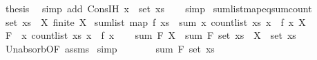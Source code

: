 \begin{isabellebody}
\ {\isacharquery}{\kern0pt}thesis\ \isamarkupfalse%
\ {\isacharparenleft}{\kern0pt}simp\ add{\isacharcolon}{\kern0pt}\ Cons{\isachardot}{\kern0pt}IH\ {\isacartoucheopen}x\ {\isasymnotin}\ set\ xs{\isacartoucheclose}{\isacharparenright}{\kern0pt}\isanewline
\ \ \isamarkupfalse%
\isanewline
{}\isamarkupfalse%
\ simp%
\endisatagproof
{\isafoldproof}%
%
\isadelimproof
\isanewline
%
\endisadelimproof
\isanewline
{}\isamarkupfalse%
\ sum{\isacharunderscore}{\kern0pt}list{\isacharunderscore}{\kern0pt}map{\isacharunderscore}{\kern0pt}eq{\isacharunderscore}{\kern0pt}sum{\isacharunderscore}{\kern0pt}count{}{\isacharcolon}{\kern0pt}\isanewline
{}\ {\isachardoublequoteopen}set\ xs\ {\isasymsubseteq}\ X{\isachardoublequoteclose}\ {\isachardoublequoteopen}finite\ X{\isachardoublequoteclose}\isanewline
{}\ {\isachardoublequoteopen}sum{\isacharunderscore}{\kern0pt}list\ {\isacharparenleft}{\kern0pt}map\ f\ xs{\isacharparenright}{\kern0pt}\ {\isacharequal}{\kern0pt}\ sum\ {\isacharparenleft}{\kern0pt}{\isasymlambda}x{\isachardot}{\kern0pt}\ count{\isacharunderscore}{\kern0pt}list\ xs\ x\ {\isacharasterisk}{\kern0pt}\ f\ x{\isacharparenright}{\kern0pt}\ X{\isachardoublequoteclose}\isanewline
%
\isadelimproof
%
\endisadelimproof
%
\isatagproof
{}\isamarkupfalse%
{\isacharminus}{\kern0pt}\isanewline
\ \ \isamarkupfalse%
\ {\isacharquery}{\kern0pt}F\ {\isacharequal}{\kern0pt}\ {\isachardoublequoteopen}{\isasymlambda}x{\isachardot}{\kern0pt}\ count{\isacharunderscore}{\kern0pt}list\ xs\ x\ {\isacharasterisk}{\kern0pt}\ f\ x{\isachardoublequoteclose}\isanewline
\ \ \isamarkupfalse%
\ {\isachardoublequoteopen}sum\ {\isacharquery}{\kern0pt}F\ X\ {\isacharequal}{\kern0pt}\ sum\ {\isacharquery}{\kern0pt}F\ {\isacharparenleft}{\kern0pt}set\ xs\ {\isasymunion}\ {\isacharparenleft}{\kern0pt}X\ {\isacharminus}{\kern0pt}\ set\ xs{\isacharparenright}{\kern0pt}{\isacharparenright}{\kern0pt}{\isachardoublequoteclose}\isanewline
\ \ \ \ \isamarkupfalse%
\ Un{\isacharunderscore}{\kern0pt}absorb{}{\isacharbrackleft}{\kern0pt}OF\ assms{\isacharparenleft}{\kern0pt}{}{\isacharparenright}{\kern0pt}{\isacharbrackright}{\kern0pt}\ \isamarkupfalse%
{\isacharparenleft}{\kern0pt}simp{\isacharparenright}{\kern0pt}\isanewline
\ \ \isamarkupfalse%
\ \isamarkupfalse%
\ {\isachardoublequoteopen}{\isasymdots}\ {\isacharequal}{\kern0pt}\ sum\ {\isacharquery}{\kern0pt}F\ {\isacharparenleft}{\kern0pt}set\ xs{\isacharparenright}{\kern0pt}{\isachardoublequoteclose}\isanewline

\end{isabellebody}
